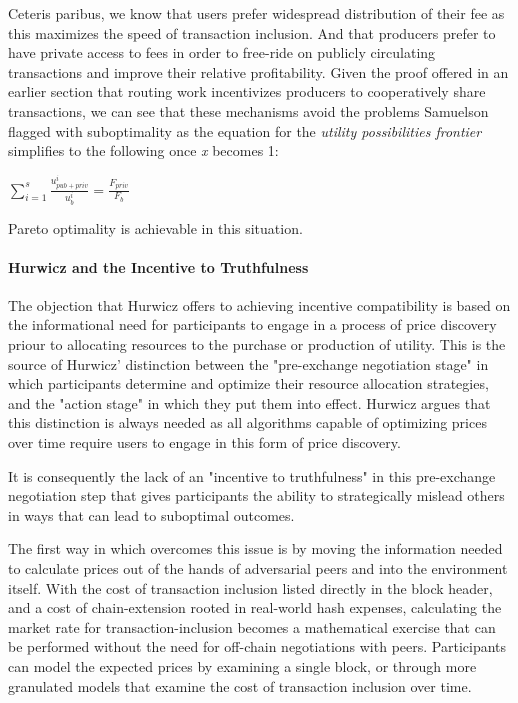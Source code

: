 {Ceteris paribus, we know that users prefer widespread distribution of their fee as this maximizes the speed of transaction inclusion. And that producers prefer to have private access to fees in order to free-ride on publicly circulating transactions and improve their relative profitability. Given the proof offered in an earlier section that routing work incentivizes producers to cooperatively share transactions, we can see that these mechanisms avoid the problems Samuelson flagged with suboptimality as the equation for the \textit{utility possibilities frontier} simplifies to the following once \textit{x} becomes 1:

\LARGE
\begin{adjustwidth}{1.5em}{1.5em}
\begin{math}
\sum_{i=1}^{s} \frac{u_{{pub}+{priv}}^i}{u_b^i} = \frac{F_{{priv}}}{F_b}
\end{math}
\end{adjustwidth}
\normalsize

Pareto optimality is achievable in this situation.







\paragraph{Hurwicz and the Incentive to Truthfulness}

The objection that Hurwicz offers to achieving incentive compatibility is based on the informational need for participants to engage in a process of price discovery priour to allocating resources to the purchase or production of utility. This is the source of Hurwicz' distinction between the "pre-exchange negotiation stage" in which participants determine and optimize their resource allocation strategies, and the "action stage" in which they put them into effect. Hurwicz argues that this distinction is always needed as all algorithms capable of optimizing prices over time require users to engage in this form of price discovery.

It is consequently the lack of an "incentive to truthfulness" in this pre-exchange negotiation step that gives participants the ability to strategically mislead others in ways that can lead to suboptimal outcomes. 

The first way in which \ourTFM overcomes this issue is by moving the information needed to calculate prices out of the hands of adversarial peers and into the environment itself. With the cost of transaction inclusion listed directly in the block header, and a cost of chain-extension rooted in real-world hash expenses, calculating the market rate for transaction-inclusion becomes a mathematical exercise that can be performed without the need for off-chain negotiations with peers. Participants can model the expected prices by examining a single block, or through more granulated models that examine the cost of transaction inclusion over time.

}
